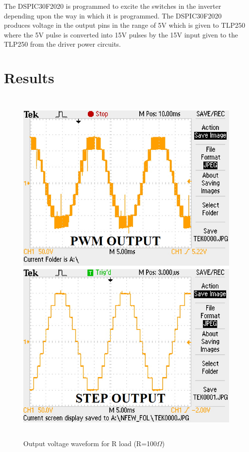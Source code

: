 \documentclass[12pt,a4paper]{report}
\begin{document}
The DSPIC30F2020 is programmed to excite the switches in the inverter depending upon the way in which it is programmed. The DSPIC30F2020 produces voltage in the output pins in the range of 5V which is given to TLP250 where the 5V pulse is converted into 15V pulses by the 15V input given to the TLP250 from the driver power circuits.\\

\clearpage

\section{Results}
\begin{figure}[H]
	\begin{center}
		\includegraphics[width=16cm,height=18.5cm]{figures/out.png}
	\end{center}
	\caption{Output voltage waveform for R load (R=100$\Omega$)}
\end{figure}
\end{document}
